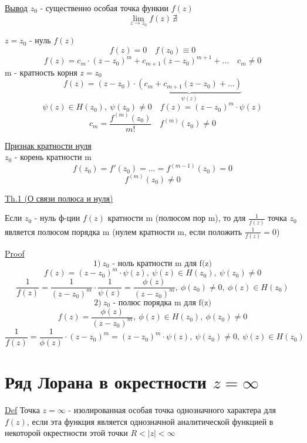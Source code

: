 \documentclass[a4paper]{article}
\begin{document}
\underline{Вывод} $ z_0 $ - существенно особая точка функии $ f(z) $ 
\[
    \lim_{z \to z_0} f(z) \, \nexists
\]

$ z = z_0 $ - нуль $ f(z) $ 
\[
    f(z) = 0 \quad f(z_0) \equiv 0
\]
\[
    f(z) = c_m \cdot (z-z_0)^{m} + c_{m+1}(z-z_0)^{m+1} + \dots \quad c_m \neq 0
\]
m - кратность корня $ z = z_0 $ 
\[
    f(z) = (z - z_0) \cdot \underbrace{(c_m + c_{m+1}(z - z_0) + \dots )}_{\psi(z)}
\]
\[
    \psi(z) \in H(z_0), \ \psi(z_0) \neq 0 \quad f(z) = (z - z_0)^{m}\cdot \psi(z)
\]
\[
    c_m = \frac{f^{(m)}(z_0)}{m!} \quad f^{(m)}(z_0) \neq 0
\]

\begin{tcolorbox}
    \underline{Признак кратности нуля}\\
    $ z_0 $ - корень кратности m
    \[
        f(z_0) = f'(z_0) = \dots = f^{(m-1)}(z_0) = 0
    \]
    \[
        f^{(m)}(z_0) \neq 0
    \]
\end{tcolorbox}

\begin{tcolorbox}
    \underline{Th.1 (О связи полюса и нуля)}
    
    Если $ z_0 $ - нуль ф-ции $ f(z) $ кратности m (полюсом пор m), то для
    $ \frac{1}{f(z)}  $ точка $ z_0 $ является полюсом порядка m (нулем кратности m,
    если положить $ \frac{1}{f(z)} = 0 $)

    \underline{Proof}
    \[
        1) \  z_0 \text{ - ноль кратности m для f(z)}
    \]
    \[
        f(z) = (z - z_0)^{m} \cdot \psi(z), \ \psi(z) \in H(z_0), \ \psi(z_0) \neq 0
    \]
    \[
        \frac{1}{f(z)}  = \frac{1}{(z - z_0)^{m}} \cdot \frac{1}{\psi(z)} 
        = \frac{\phi(z)}{(z-z_0)^{m}}, \ \phi(z_0) \neq 0, \ \phi(z) \in H(z_0)
    \]
    \[
        2) \  z_0 \text{ - полюс порядка m для f(z)}
    \]
    \[
        f(z) = \frac{\phi(z)}{(z - z_0)^{m}}, \ \phi(z) \in H(z_0), \ \phi(z_0) \neq 0
    \]
    \[
        \frac{1}{f(z)}  = \frac{1}{\phi(z)} \cdot (z-  z_0)^{m} = 
        (z- z_0)^{m} \cdot \psi(z), \ \psi(z_0) \neq 0, \ \psi(z) \in H(z_0)
    \]
\end{tcolorbox}

\section*{\centering Ряд Лорана в окрестности $ z = \infty $}
\begin{tcolorbox}
\underline{Def}
Точка $ z = \infty $ - изолированная особая точка однозначного характера для $ f(z) $,
если эта функция является однозначной аналитической функцией в некоторой окрестности
этой точки $ R < |z| < \infty $ 
\end{tcolorbox}
\end{document}
